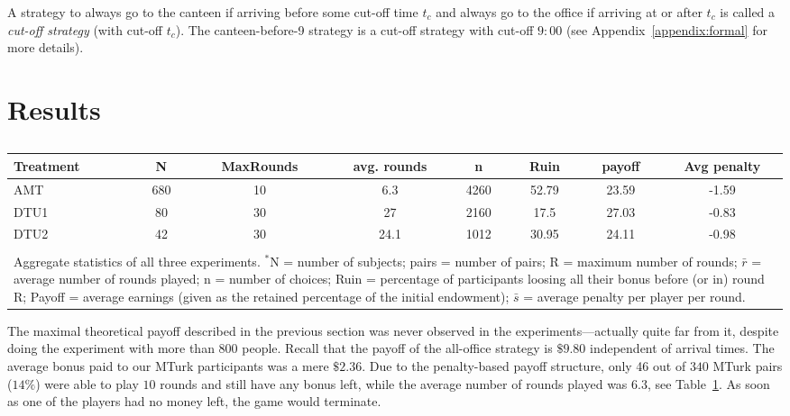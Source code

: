 A strategy to always go to the canteen if arriving before some cut-off time $t_c$ and always go to the office if arriving at or after $t_c$ is called a \emph{cut-off strategy} (with cut-off $t_c$). The canteen-before-9 strategy is a cut-off strategy with cut-off $9{:}00$ (see Appendix~\ref{appendix:formal} for more details).

\section{Results}
\label{S:results}
\begin{table}%
\caption{} %

\smallskip
\centering
\setlength{\arrayrulewidth}{1pt}
\setlength{\tabcolsep}{4pt}
\begin{tabular}{l|ccccccc}
\hline
\small Treatment   & \small   N &   \small MaxRounds &  \small  avg. rounds &  \small  n &  \small Ruin & \small   payoff & \small   Avg penalty \\
\hline
\small AMT         & 680 &          10 &          6.3 & 4260 &  52.79 &    23.59 &         -1.59 \\
\small DTU1        &  80 &          30 &         27    & 2160 &  17.5  &    27.03 &         -0.83 \\
\small DTU2        &  42 &          30 &         24.1  & 1012 &  30.95 &    24.11 &         -0.98 \\
\hline  \multicolumn{7}{c}{} \\[-2mm]
\multicolumn{8}{p{12cm}}{Aggregate statistics of all three experiments. $^*$N = number of subjects; pairs = number of pairs; R = maximum number of rounds; $\bar r$ = average number of rounds played; n = number of choices; Ruin = percentage of participants loosing all their bonus before (or in) round R; Payoff = average earnings (given as the retained percentage of the initial endowment); $\bar s$ = average penalty per player per round.} \\
\end{tabular}
\label{table:1}
\end{table}
The maximal theoretical payoff described in the previous section was never observed in the experiments---actually quite far from it, despite doing the experiment with more than $800$ people. Recall that the payoff of the all-office strategy is $\$9.80$ independent of arrival times. The average bonus paid to our MTurk participants was a mere $\$2.36$. Due to the penalty-based payoff structure, only 46 out of $340$ MTurk pairs ($14\%$) were able to play $10$ rounds and still have any bonus left, while the average number of rounds played was $6.3$, see Table~\ref{table:1}. As soon as one of the players had no money left, the game would terminate.

